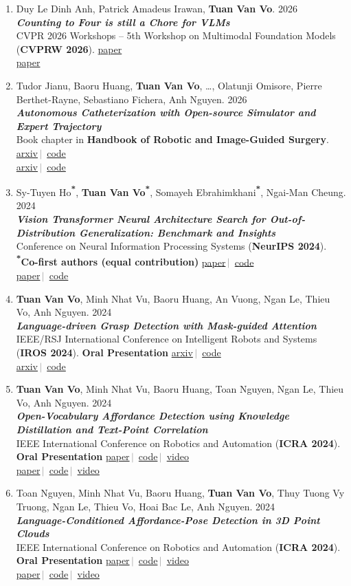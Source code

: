 \documentclass[10pt,a4paper]{article}
\newcommand{\link}[2]{\href{#1}{\textcolor{linkblue}{#2}}}
\newcommand{\hl}[1]{\textcolor{hlred}{\textbf{#1}}}
\newcommand{\sep}{\,\textcolor{gray}{$|$}\,}
\newcommand{\eq}{\textsuperscript{\textcolor{hlred}{\textbf{*}}}}
\newcommand{\cofirst}{\hl{\textsuperscript{*}Co-first authors (equal contribution)}}
\newcommand{\me}{\textbf{Tuan Van Vo}}
\newenvironment{publist}{%
  \begin{enumerate}[leftmargin=0.38in,itemsep=7pt,topsep=2pt,
                    label=\arabic*.]\small
}{\end{enumerate}}
\newcommand{\pub}[4]{%
  \Needspace{5\baselineskip}\item #1\\
  \textbf{\textit{#2}}\\
  #3%
  \ifx\relax#4\relax\else\\ #4\fi
}
\begin{document}
\begin{publist}
  \pub{Duy Le Dinh Anh, Patrick Amadeus Irawan, \me. 2026}
      {Counting to Four is still a Chore for VLMs}
      {CVPR 2026 Workshops -- 5th Workshop on Multimodal Foundation Models (\textbf{CVPRW 2026}).}
      {\link{https://openaccess.thecvf.com/content/CVPR2026W/MMFM5/papers/Le_Dinh_Anh_Counting_to_Four_is_still_a_Chore_for_VLMs_CVPRW_2026_paper.pdf}{paper}}

  \pub{Tudor Jianu, Baoru Huang, \me, \ldots, Olatunji Omisore, Pierre Berthet-Rayne, Sebastiano Fichera, Anh Nguyen. 2026}
      {Autonomous Catheterization with Open-source Simulator and Expert Trajectory}
      {Book chapter in \textbf{Handbook of Robotic and Image-Guided Surgery}.}
      {\link{https://arxiv.org/abs/2401.09059}{arxiv}\sep
       \link{https://github.com/airvlab/cathsim}{code}}

  \pub{Sy-Tuyen Ho\eq, \me\eq, Somayeh Ebrahimkhani\eq, Ngai-Man Cheung. 2024}
      {Vision Transformer Neural Architecture Search for Out-of-Distribution Generalization: Benchmark and Insights}
      {Conference on Neural Information Processing Systems (\textbf{NeurIPS 2024}). \cofirst}
      {\link{https://proceedings.neurips.cc/paper_files/paper/2024/file/9952369f49ecc064d169fe6612cbf204-Paper-Conference.pdf}{paper}\sep
       \link{https://github.com/vovantuan1999a/OoD-ViT-NAS}{code}}

  \pub{\me, Minh Nhat Vu, Baoru Huang, An Vuong, Ngan Le, Thieu Vo, Anh Nguyen. 2024}
      {Language-driven Grasp Detection with Mask-guided Attention}
      {IEEE/RSJ International Conference on Intelligent Robots and Systems (\textbf{IROS 2024}). \hl{Oral Presentation}}
      {\link{https://arxiv.org/abs/2407.19877}{arxiv}\sep
       \link{https://github.com/Fsoft-AIC/LGD-MaskedGuideAttention}{code}}

  \pub{\me, Minh Nhat Vu, Baoru Huang, Toan Nguyen, Ngan Le, Thieu Vo, Anh Nguyen. 2024}
      {Open-Vocabulary Affordance Detection using Knowledge Distillation and Text-Point Correlation}
      {IEEE International Conference on Robotics and Automation (\textbf{ICRA 2024}). \hl{Oral Presentation}}
      {\link{https://ieeexplore.ieee.org/abstract/document/10610247}{paper}\sep
       \link{https://github.com/Fsoft-AIC/Open-Vocabulary-Affordance-Detection-using-Knowledge-Distillation-and-Text-Point-Correlation}{code}\sep
       \link{https://drive.google.com/file/d/1nfY4RlT41AHQbnuPyuZo9DnwkenWE8qA/view}{video}}

  \pub{Toan Nguyen, Minh Nhat Vu, Baoru Huang, \me, Thuy Tuong Vy Truong, Ngan Le, Thieu Vo, Hoai Bac Le, Anh Nguyen. 2024}
      {Language-Conditioned Affordance-Pose Detection in 3D Point Clouds}
      {IEEE International Conference on Robotics and Automation (\textbf{ICRA 2024}). \hl{Oral Presentation}}
      {\link{https://ieeexplore.ieee.org/abstract/document/10610008}{paper}\sep
       \link{https://github.com/Fsoft-AIC/Language-Conditioned-Affordance-Pose-Detection-in-3D-Point-Clouds}{code}\sep
       \link{https://drive.google.com/file/d/1oxkoIKNNlNrE_UiVz4SA1Tcc0061PJnb/view}{video}}


\end{publist}
\end{document}
